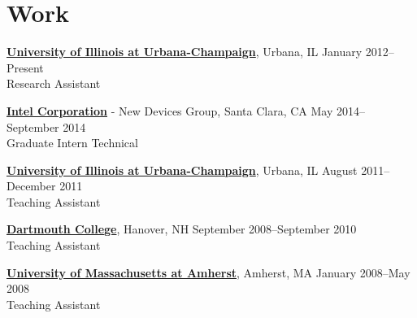 \section{\sc Work}
{\href{http://www.illinois.edu/}{{\bf University of Illinois at Urbana-Champaign}}}, Urbana, IL \hfill January 2012--Present\\
Research Assistant
\vspace{-0.16cm}

{\href{http://www.intel.com/}{{\bf Intel Corporation}}} - New Devices Group, Santa Clara, CA \hfill May 2014--September 2014\\
Graduate Intern Technical
\vspace{-0.16cm}

{\href{http://www.illinois.edu/}{{\bf University of Illinois at Urbana-Champaign}}}, Urbana, IL \hfill August 2011--December 2011\\
Teaching Assistant
\vspace{-0.16cm}

{\href{http://www.dartmouth.edu/}{{\bf Dartmouth College}}}, Hanover, NH \hfill September 2008--September 2010\\
Teaching Assistant
\vspace{-0.16cm}

{\href{http://www.umass.edu/}{{\bf University of Massachusetts at Amherst}}}, Amherst, MA \hfill January 2008--May 2008\\
Teaching Assistant
